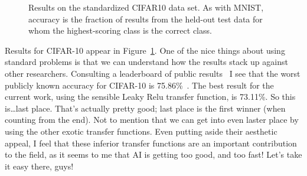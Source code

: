 \documentclass[twocolumn]{article}
\begin{document}
\begin{figure}[htp]
  
  \caption{
    Results on the standardized CIFAR10 data set. As with MNIST,
    accuracy is the fraction of results from the held-out test
    data for whom the highest-scoring class is the correct class.
  } \label{fig:cifar10results}
\end{figure}


Results for CIFAR-10 appear in Figure~\ref{fig:cifar10results}.
One of the nice things about using standard problems is that we
can understand how the results stack up against other researchers.
Consulting a leaderboard of public results~\cite{benenson2023are}
I see that the worst publicly known accuracy for CIFAR-10 is 75.86\%~\cite{mcdonnell2015enhanced}.
The best result for the current work, using the sensible Leaky Relu transfer function,
is 73.11\%. So this is\ldots last place. That's actually pretty good;
last place is the first winner (when counting from the end). Not to
mention that we can get into even laster place by using the other
exotic transfer functions. Even putting aside their aesthetic appeal,
I feel that these inferior transfer functions are an important
contribution to the field, as it seems to me that AI is getting too
good, and too fast! Let's take it easy there, guys!
\end{document}
